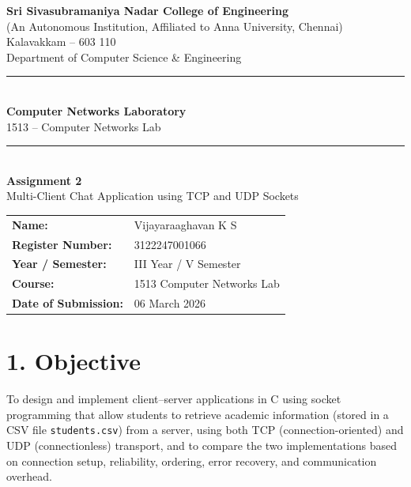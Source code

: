 \documentclass[11pt]{article}
\title{\vspace{-2cm}}
\date{}
\begin{document}
\begin{titlepage}
\centering
\vspace*{1cm}
{\large \textbf{Sri Sivasubramaniya Nadar College of Engineering}}\\
{\small (An Autonomous Institution, Affiliated to Anna University, Chennai)}\\
{\small Kalavakkam -- 603 110}\\[0.3cm]
{\small Department of Computer Science \& Engineering}\\[1.5cm]

\rule{\linewidth}{0.5mm}\\[0.4cm]
{\LARGE \textbf{Computer Networks Laboratory}}\\[0.3cm]
{\Large 1513 -- Computer Networks Lab}\\[0.4cm]
\rule{\linewidth}{0.5mm}\\[1.5cm]

{\huge \textbf{Assignment 2}}\\[0.4cm]
{\Large Multi-Client Chat Application using TCP and UDP Sockets}\\[2cm]

\begin{center}
\begin{tabular}{ll}
\textbf{Name:} & Vijayaraaghavan K S \\[0.2cm]
\textbf{Register Number:} & 3122247001066 \\[0.2cm]
\textbf{Year / Semester:} & III Year / V Semester \\[0.2cm]
\textbf{Course:} & 1513 Computer Networks Lab \\[0.2cm]
\textbf{Date of Submission:} & 06 March 2026 \\[0.2cm]
\end{tabular}
\end{center}

\vfill
\end{titlepage}

\section*{1. Objective}
To design and implement client--server applications in C using socket programming that allow
students to retrieve academic information (stored in a CSV file \texttt{students.csv}) from a
server, using both TCP (connection-oriented) and UDP (connectionless) transport, and to compare
the two implementations based on connection setup, reliability, ordering, error recovery, and
communication overhead.
\end{document}
